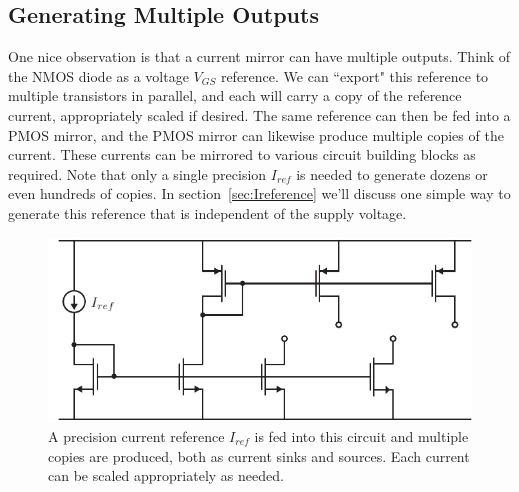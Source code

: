 \subsection{Generating Multiple Outputs}
One nice observation is that a current mirror can have multiple outputs.  Think of the NMOS diode as a voltage $V_{GS}$ reference.  We can ``export" this reference to multiple transistors in parallel, and each will carry a copy of the reference current, appropriately scaled if desired.  The same reference can then be fed into a PMOS mirror, and the PMOS mirror can likewise produce multiple copies of the current.  These currents can be mirrored to various circuit building blocks as required.  Note that only a single precision $I_{ref}$ is needed to generate dozens or even hundreds of copies.  In section~\ref{sec:Ireference} we'll discuss one simple way to generate this reference that is independent of the supply voltage.
\begin{figure}[tb]
\centering
\includegraphics[scale=1]{19current_mirror_multioutput.pdf}
\caption{A precision current reference $I_{ref}$ is fed into this circuit and multiple copies are produced, both as current sinks and sources.  Each current can be scaled appropriately as needed.} \label{fig:19current_mirror_multioutput.pdf}
\end{figure}
